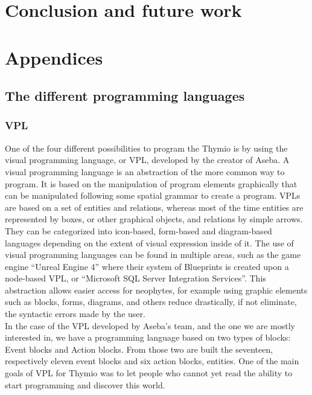\documentclass{scrartcl}
\begin{document}
\section{Conclusion and future work}

\section{Appendices}

\subsection{The different programming languages} \label{fourlanguages}
\subsubsection{VPL}

One of the four different possibilities to program the Thymio is by using the visual programming language, or VPL, 
developed by the creator of Aseba. A visual programming language is an abstraction of the more common way to program. 
It is based on the manipulation of program elements graphically that can be manipulated following some spatial grammar to create a program. 
VPLs are based on a set of entities and relations, whereas most of the time entities are represented by boxes, 
or other graphical objects, and relations by simple arrows. They can be categorized into icon-based, 
form-based and diagram-based languages depending on the extent of visual expression inside of it. 
The use of visual programming languages can be found in multiple areas, such as the game engine “Unreal Engine 4” where their system of Blueprints is created upon a node-based VPL, 
or “Microsoft SQL Server Integration Services”. This abstraction allows easier access for neophytes, 
for example using graphic elements such as blocks, forms, diagrams, and others reduce drastically, if not eliminate, the syntactic errors made by the user.\\

In the case of the VPL developed by Aseba’s team, and the one we are mostly interested in, we have a programming language based on two types of blocks: Event blocks and Action blocks. 
From those two are built the seventeen, respectively eleven event blocks and six action blocks, entities. 
One of the main goals of VPL for Thymio was to let people who cannot yet read the ability to start programming and discover this world.\\
\end{document}
